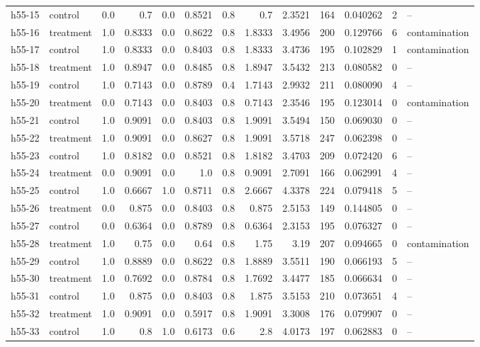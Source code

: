 \documentclass[11pt,a4paper]{article}
\begin{document}
\begin{footnotesize}
\begin{longtable}{llrrrrrrrrrrl}
h55-15 & control & 0.0 & 0.7 & 0.0 & 0.8521 & 0.8 & 0.7 & 2.3521 & 164 & 0.040262 & 2 & -- \\
h55-16 & treatment & 1.0 & 0.8333 & 0.0 & 0.8622 & 0.8 & 1.8333 & 3.4956 & 200 & 0.129766 & 6 & contamination \\
h55-17 & control & 1.0 & 0.8333 & 0.0 & 0.8403 & 0.8 & 1.8333 & 3.4736 & 195 & 0.102829 & 1 & contamination \\
h55-18 & treatment & 1.0 & 0.8947 & 0.0 & 0.8485 & 0.8 & 1.8947 & 3.5432 & 213 & 0.080582 & 0 & -- \\
h55-19 & control & 1.0 & 0.7143 & 0.0 & 0.8789 & 0.4 & 1.7143 & 2.9932 & 211 & 0.080090 & 4 & -- \\
h55-20 & treatment & 0.0 & 0.7143 & 0.0 & 0.8403 & 0.8 & 0.7143 & 2.3546 & 195 & 0.123014 & 0 & contamination \\
h55-21 & control & 1.0 & 0.9091 & 0.0 & 0.8403 & 0.8 & 1.9091 & 3.5494 & 150 & 0.069030 & 0 & -- \\
h55-22 & treatment & 1.0 & 0.9091 & 0.0 & 0.8627 & 0.8 & 1.9091 & 3.5718 & 247 & 0.062398 & 0 & -- \\
h55-23 & control & 1.0 & 0.8182 & 0.0 & 0.8521 & 0.8 & 1.8182 & 3.4703 & 209 & 0.072420 & 6 & -- \\
h55-24 & treatment & 0.0 & 0.9091 & 0.0 & 1.0 & 0.8 & 0.9091 & 2.7091 & 166 & 0.062991 & 4 & -- \\
h55-25 & control & 1.0 & 0.6667 & 1.0 & 0.8711 & 0.8 & 2.6667 & 4.3378 & 224 & 0.079418 & 5 & -- \\
h55-26 & treatment & 0.0 & 0.875 & 0.0 & 0.8403 & 0.8 & 0.875 & 2.5153 & 149 & 0.144805 & 0 & -- \\
h55-27 & control & 0.0 & 0.6364 & 0.0 & 0.8789 & 0.8 & 0.6364 & 2.3153 & 195 & 0.076327 & 0 & -- \\
h55-28 & treatment & 1.0 & 0.75 & 0.0 & 0.64 & 0.8 & 1.75 & 3.19 & 207 & 0.094665 & 0 & contamination \\
h55-29 & control & 1.0 & 0.8889 & 0.0 & 0.8622 & 0.8 & 1.8889 & 3.5511 & 190 & 0.066193 & 5 & -- \\
h55-30 & treatment & 1.0 & 0.7692 & 0.0 & 0.8784 & 0.8 & 1.7692 & 3.4477 & 185 & 0.066634 & 0 & -- \\
h55-31 & control & 1.0 & 0.875 & 0.0 & 0.8403 & 0.8 & 1.875 & 3.5153 & 210 & 0.073651 & 4 & -- \\
h55-32 & treatment & 1.0 & 0.9091 & 0.0 & 0.5917 & 0.8 & 1.9091 & 3.3008 & 176 & 0.079907 & 0 & -- \\
h55-33 & control & 1.0 & 0.8 & 1.0 & 0.6173 & 0.6 & 2.8 & 4.0173 & 197 & 0.062883 & 0 & -- \\

\end{longtable}
\end{footnotesize}
\end{document}
